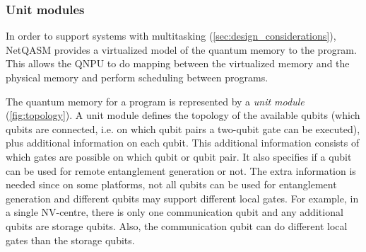 
\subsubsection{Unit modules}
In order to support systems with multitasking (\cref{sec:design_considerations}), \ac{NetQASM} provides a virtualized model of the quantum memory to the program.
This allows the \ac{QNPU} to do mapping between the virtualized memory and the physical memory and perform scheduling between programs.

The quantum memory for a program is represented by a \textit{unit module} (\cref{fig:topology}).
A unit module defines the topology of the available qubits (which qubits are connected, i.e. on which qubit pairs a two-qubit gate can be executed), plus additional information on each qubit.
This additional information consists of which gates are possible on which qubit or qubit pair.
It also specifies if a qubit can be used for remote entanglement generation or not.
The extra information is needed since on some platforms, not all qubits can be used for entanglement generation and different qubits may support different local gates.
For example, in a single NV-centre, there is only one communication qubit and any additional qubits are storage qubits.
Also, the communication qubit can do different local gates than the storage qubits.

